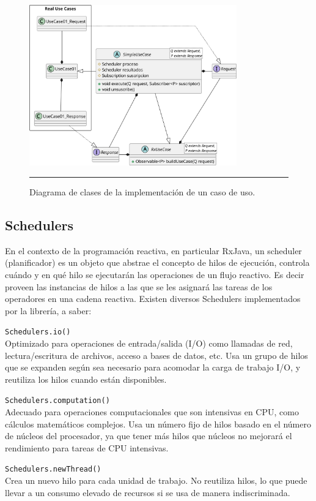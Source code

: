 \begin{figure}[htbp]
	\centering
	\includegraphics[width=0.8\textwidth]{Figures/iter/CLASS_use_cases.png}
	\rule{35em}{1pt}
	\caption[Class Diagram]{Diagrama de clases de la implementación de un caso de uso.}
	\label{fig:class_usecases}
\end{figure}

\subsection{Schedulers}
En el contexto de la programación reactiva, en particular RxJava, un scheduler (planificador) es un objeto que abstrae el concepto de hilos de ejecución, controla cuándo y en qué hilo se ejecutarán las operaciones de un flujo reactivo. Es decir proveen las instancias de hilos a las que se les asignará las tareas de los operadores en una cadena reactiva. Existen diversos Schedulers implementados por la librería, a saber:

\texttt{Schedulers.io()}\\
Optimizado para operaciones de entrada/salida (I/O) como llamadas de red, lectura/escritura de archivos, acceso a bases de datos, etc.
Usa un grupo de hilos que se expanden según sea necesario para acomodar la carga de trabajo I/O, y reutiliza los hilos cuando están disponibles.

\texttt{Schedulers.computation()}\\
Adecuado para operaciones computacionales que son intensivas en CPU, como cálculos matemáticos complejos.
Usa un número fijo de hilos basado en el número de núcleos del procesador, ya que tener más hilos que núcleos no mejorará el rendimiento para tareas de CPU intensivas.

\texttt{Schedulers.newThread()}\\
Crea un nuevo hilo para cada unidad de trabajo.
No reutiliza hilos, lo que puede llevar a un consumo elevado de recursos si se usa de manera indiscriminada.

